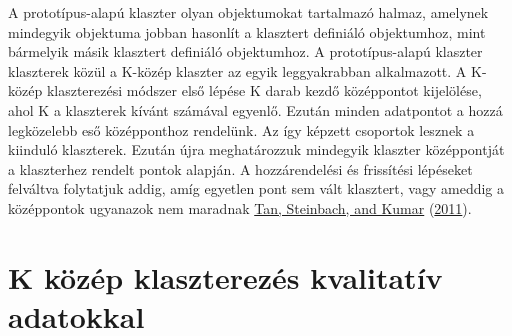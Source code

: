 \documentclass[
]{book}
\begin{document}
A prototípus-alapú klaszter olyan objektumokat tartalmazó halmaz,
amelynek mindegyik objektuma jobban hasonlít a klasztert definiáló
objektumhoz, mint bármelyik másik klasztert definiáló objektumhoz. A
prototípus-alapú klaszter klaszterek közül a K-közép klaszter az egyik
leggyakrabban alkalmazott. A K-közép klaszterezési módszer első lépése K
darab kezdő középpontot kijelölése, ahol K a klaszterek kívánt számával
egyenlő. Ezután minden adatpontot a hozzá legközelebb eső középponthoz
rendelünk. Az így képzett csoportok lesznek a kiinduló klaszterek.
Ezután újra meghatározzuk mindegyik klaszter középpontját a klaszterhez
rendelt pontok alapján. A hozzárendelési és frissítési lépéseket
felváltva folytatjuk addig, amíg egyetlen pont sem vált klasztert, vagy
ameddig a középpontok ugyanazok nem maradnak
\protect\hyperlink{ref-tan2011a}{Tan, Steinbach, and Kumar}
(\protect\hyperlink{ref-tan2011a}{2011}).

\hypertarget{k-kuxf6zuxe9p-klaszterezuxe9s-kvalitatuxedv-adatokkal}{%
\section{K közép klaszterezés kvalitatív
adatokkal}\label{k-kuxf6zuxe9p-klaszterezuxe9s-kvalitatuxedv-adatokkal}}
\end{document}
